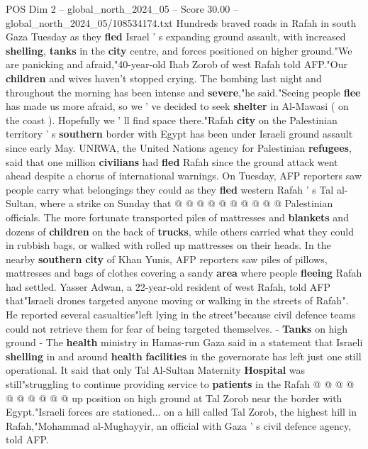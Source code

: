 \begin{textsample}{POS Dim 2 – global\_north\_2024\_05 – Score 30.00 – global\_north\_2024\_05/108534174.txt}  \label{ex:f2_pos_297}
Hundreds braved roads in Rafah in south Gaza Tuesday as they \textbf{fled} Israel ' s expanding ground assault, with increased \textbf{shelling}, \textbf{tanks} in the \textbf{city} centre, and forces positioned on higher ground."We are panicking and afraid,"40-year-old Ihab Zorob of west Rafah told AFP."Our \textbf{children} and wives haven't stopped crying.
The bombing last night and throughout the morning has been intense and \textbf{severe},"he said."Seeing people \textbf{flee} has made us more afraid, so we ' ve decided to seek \textbf{shelter} in Al-Mawasi ( on the coast ).
Hopefully we ' ll find space there."Rafah \textbf{city} on the Palestinian territory ' s \textbf{southern} border with Egypt has been under Israeli ground assault since early May.
UNRWA, the United Nations agency for Palestinian \textbf{refugees}, said that one million \textbf{civilians} had \textbf{fled} Rafah since the ground attack went ahead despite a chorus of international warnings.
On Tuesday, AFP reporters saw people carry what belongings they could as they \textbf{fled} western Rafah ' s Tal al-Sultan, where a strike on Sunday that @ @ @ @ @ @ @ @ @ @ Palestinian officials.
The more fortunate transported piles of mattresses and \textbf{blankets} and dozens of \textbf{children} on the back of \textbf{trucks}, while others carried what they could in rubbish bags, or walked with rolled up mattresses on their heads.
In the nearby \textbf{southern} \textbf{city} of Khan Yunis, AFP reporters saw piles of pillows, mattresses and bags of clothes covering a sandy \textbf{area} where people \textbf{fleeing} Rafah had settled.
Yasser Adwan, a 22-year-old resident of west Rafah, told AFP that"Israeli drones targeted anyone moving or walking in the streets of Rafah".
He reported several casualties"left lying in the street"because civil defence teams could not retrieve them for fear of being targeted themselves. - \textbf{Tanks} on high ground - The \textbf{health} ministry in Hamas-run Gaza said in a statement that Israeli \textbf{shelling} in and around \textbf{health} \textbf{facilities} in the governorate has left just one still operational.
It said that only Tal Al-Sultan Maternity \textbf{Hospital} was still"struggling to continue providing service to \textbf{patients} in the Rafah @ @ @ @ @ @ @ @ @ @ up position on high ground at Tal Zorob near the border with Egypt."Israeli forces are stationed... on a hill called Tal Zorob, the highest hill in Rafah,"Mohammad al-Mughayyir, an official with Gaza ' s civil defence agency, told AFP.

\end{textsample}
